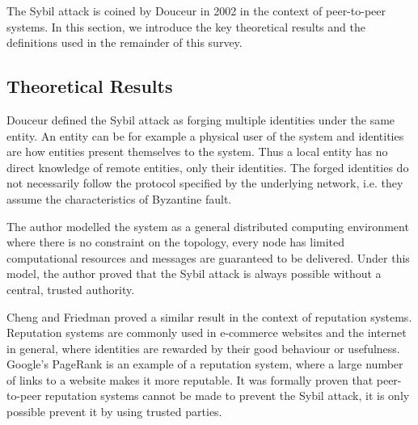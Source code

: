 The Sybil attack is coined by Douceur\cite{douceur2002sybil} in 2002 in the
context of peer-to-peer systems. In this section, we introduce the key
theoretical results and the definitions used in the remainder of this survey.

\subsection{Theoretical Results}\label{sec:sybil-theory}
Douceur defined the Sybil attack as forging multiple identities under the same
entity\cite{douceur2002sybil}. An entity can be for example a physical user of
the system and identities are how entities present themselves to the system.
Thus a local entity has no direct knowledge of remote entities, only their
identities. The forged identities do not necessarily follow the protocol
specified by the underlying network, i.e. they assume the characteristics of
Byzantine fault\cite{lamport1982byzantine}.

The author modelled the system as a general distributed computing environment
where there is no constraint on the topology, every node has limited
computational resources and messages are guaranteed to be delivered. Under this
model, the author proved that the Sybil attack is always possible without a
central, trusted authority.


Cheng and Friedman proved a similar result in the context of reputation
systems\cite{cheng2005sybilproof}. Reputation systems are commonly used in
e-commerce websites and the internet in general, where identities are rewarded
by their good behaviour or usefulness. Google's PageRank\cite{page1999pagerank}
is an example of a reputation system, where a large number of links to a website
makes it more reputable. It was formally proven that peer-to-peer reputation
systems cannot be made to prevent the Sybil attack, it is only possible prevent
it by using trusted parties.

